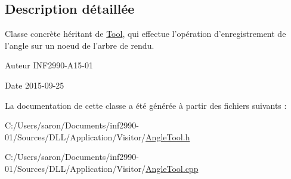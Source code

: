 \subsection{Description détaillée}
Classe concrète héritant de \hyperlink{class_tool}{Tool}, qui effectue l'opération d'enregistrement de l'angle sur un noeud de l'arbre de rendu. 

\begin{DoxyAuthor}{Auteur}
I\-N\-F2990-\/\-A15-\/01 
\end{DoxyAuthor}
\begin{DoxyDate}{Date}
2015-\/09-\/25 
\end{DoxyDate}


La documentation de cette classe a été générée à partir des fichiers suivants \-:\begin{DoxyCompactItemize}
\item 
C\-:/\-Users/saron/\-Documents/inf2990-\/01/\-Sources/\-D\-L\-L/\-Application/\-Visitor/\hyperlink{_angle_tool_8h}{Angle\-Tool.\-h}\item 
C\-:/\-Users/saron/\-Documents/inf2990-\/01/\-Sources/\-D\-L\-L/\-Application/\-Visitor/\hyperlink{_angle_tool_8cpp}{Angle\-Tool.\-cpp}\end{DoxyCompactItemize}
